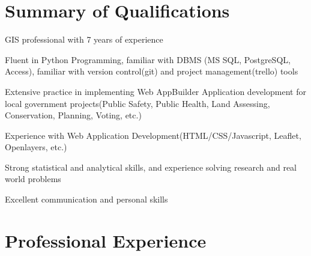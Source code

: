\documentclass[]{deedy-resume-openfont}
\begin{document}
\begin{minipage}[t]{0.3\textwidth}
%
%

\end{minipage} 
\hfill
\begin{minipage}[t]{0.66\textwidth} 
	

\section{Summary of Qualifications}



\vspace{\topsep}
\vspace{\topsep}  %
\begin{tightemize}
	\item GIS professional with 7 years of experience 
	\item Fluent in Python Programming, familiar with DBMS (MS SQL, PostgreSQL, Access), familiar with version control(git) and project management(trello) tools
	\item Extensive practice in implementing Web AppBuilder Application development for local government projects(Public Safety, Public Health, Land Assessing, Conservation, Planning, Voting, etc.)
	\item Experience with Web Application Development(HTML/CSS/Javascript, Leaflet, Openlayers, etc.)
	\item Strong statistical and analytical skills, and experience solving research and real world problems
	\item Excellent communication and personal skills
\end{tightemize}




\vspace{\topsep}
\section{Professional Experience}


\end{minipage}
\end{document}

